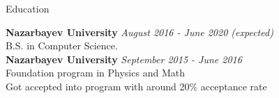 \documentclass{resume}
\begin{document}

\begin{rSection}{Education}

{\bf Nazarbayev University} \hfill {\em August 2016 - June 2020 (expected)} \\ 
B.S. in Computer Science.\\
{\bf Nazarbayev University} \hfill {\em September 2015 - June 2016} \\ 
Foundation program in Physics and Math \\
Got accepted into program with around 20\% acceptance rate
\end{rSection}

\end{document}
